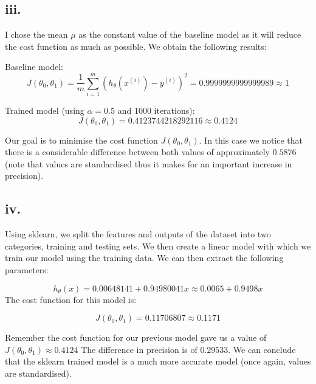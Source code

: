 \documentclass[10pt]{article}
\begin{document}
\subsection*{iii.}
I chose the mean $\mu$ as the constant value of the baseline model as it will reduce the cost function 
as much as possible.
We obtain the following results:

Baseline model:
\begin{equation*}
    J(\theta_{0}, \theta_{1}) = \frac{1}{m}\sum_{i=1}^{m}(h_{\theta}(x^{(i)}) - y^{(i)})^{2} = 0.9999999999999989 \approx 1
\end{equation*}

Trained model (using $\alpha = 0.5$ and 1000 iterations):
\begin{equation*}
    J(\theta_{0}, \theta_{1}) = 0.4123744218292116 \approx 0.4124
\end{equation*}

Our goal is to minimise the cost function $J(\theta_{0}, \theta_{1})$. In this case we notice that there is 
a considerable difference between both values of approximately $0.5876$ (note that values are standardised
thus it makes for an important increase in precision).

\subsection*{iv.}
Using sklearn, we split the features and outputs of the dataset into two categories, training and testing sets. We then create a 
linear model with which we train our model using the training data. We can then extract the following parameters:

\begin{equation*}
    h_{\theta}(x) = 0.00648141 + 0.94980041x \approx 0.0065 + 0.9498x
\end{equation*}
The cost function for this model is:

\begin{equation*}
    J(\theta_{0}, \theta_{1}) = 0.11706807 \approx 0.1171
\end{equation*}

Remember the cost function for our previous model gave us a value of $J(\theta_{0}, \theta_{1}) \approx 0.4124$
The difference in precision is of $0.29533$. We can conclude that the sklearn trained model
is a much more accurate model (once again, values are standardised).
\end{document}
